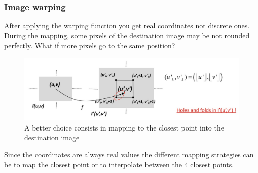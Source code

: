 \subsubsection{Image warping}

After applying the warping function you get real coordinates not discrete ones.
During the mapping, some pixels of the destination image may be not rounded perfectly.
What if more pixels go to the same position?
\begin{figure}[htbp]
  \centering
  \includegraphics[width=0.8\linewidth]{./img/forward_mapping.jpg}
  \caption{A better choice consists in mapping to the closest point into the destination image}
  \label{fig:forward_mapping}
\end{figure}

Since the coordinates are always real values the different mapping strategies can be to map the closest point or to interpolate between the 4 closest points.
